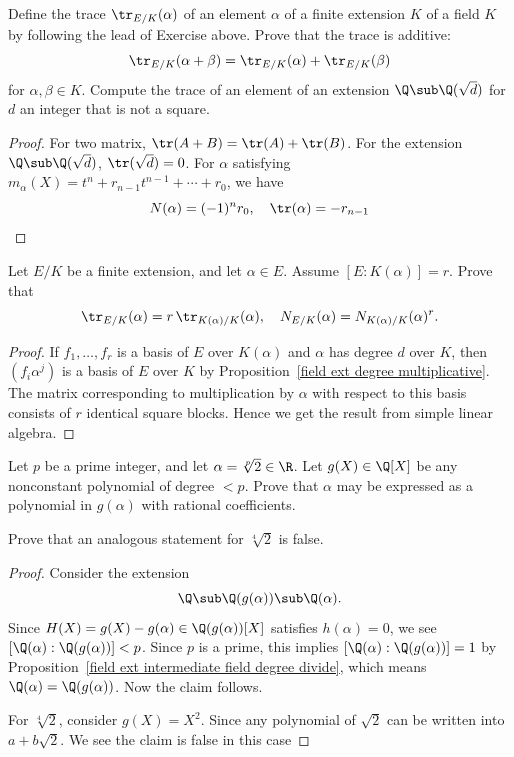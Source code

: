 \begin{exercise}\label{norm trace formula}
Define the trace $\tr_{E/K}(\alpha)$ of an element $\alpha$ of a finite extension $K$ of a field $K$ by following the lead of Exercise above. Prove that the trace is additive:
\[\tr_{E/K}(\alpha+\beta)=\tr_{E/K}(\alpha)+\tr_{E/K}(\beta)\]
for $\alpha,\beta\in K$. Compute the trace of an element of an extension $\Q\sub\Q(\sqrt{d})$ for $d$ an integer that is not a square.
\end{exercise}
\begin{proof}
For two matrix, $\tr(A+B)=\tr(A)+\tr(B)$. For the extension $\Q\sub\Q(\sqrt{d})$, $\tr(\sqrt{d})=0$.
For $\alpha$ satisfying $m_\alpha(X)=t^n+r_{n-1}t^{n-1}+\cdots+r_0$, we have
\[N(\alpha)=(-1)^nr_0,\quad \tr(\alpha)=-r_{n-1}\]
\end{proof}
\begin{exercise}
Let $E/K$ be a finite extension, and let $\alpha\in E$. Assume $[E:K(\alpha)]=r$. Prove that
\[\tr_{E/K}(\alpha)=r\,\tr_{K(\alpha)/K}(\alpha),\quad N_{E/K}(\alpha)=N_{K(\alpha)/K}(\alpha)^r.\]
\end{exercise}
\begin{proof}
If $f_1,\dots,f_r$ is a basis of $E$ over $K(\alpha)$ and $\alpha$ has degree $d$ over $K$, then $(f_i\alpha^j)$ is a basis of $E$ over $K$ by Proposition~\ref{field ext degree multiplicative}. The matrix
corresponding to multiplication by $\alpha$ with respect to this basis consists of $r$ identical square blocks. Hence we get the result from simple linear algebra.
\end{proof}
\begin{exercise}
Let $p$ be a prime integer, and let $\alpha=\sqrt[p]{2}\in\R$. Let $g(X)\in\Q[X]$ be any nonconstant
polynomial of degree $<p$. Prove that $\alpha$ may be expressed as a polynomial in $g(\alpha)$ with rational coefficients.\par
Prove that an analogous statement for $\sqrt[4]{2}$ is false.
\end{exercise}
\begin{proof}
Consider the extension
\[\Q\sub\Q(g(\alpha))\sub\Q(\alpha).\]
Since $H(X)=g(X)-g(\alpha)\in \Q(g(\alpha))[X]$ satisfies $h(\alpha)=0$, we see $[\Q(\alpha):\Q(g(\alpha))]<p$. Since $p$ is a prime, this implies $[\Q(\alpha):\Q(g(\alpha))]=1$ by Proposition~\ref{field ext intermediate field degree divide}, which means $\Q(\alpha)=\Q(g(\alpha))$. Now the claim follows.\par
For $\sqrt[4]{2}$, consider $g(X)=X^2$. Since any polynomial of $\sqrt{2}$ can be written into $a+b\sqrt{2}$. We see the claim is false in this case
\end{proof}
